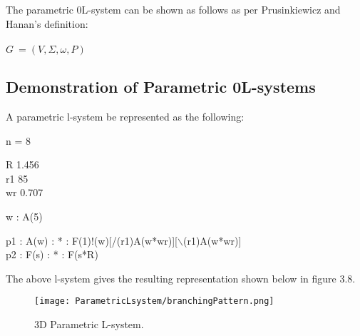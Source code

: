 \begin{flushleft}
The parametric 0L-system can be shown as follows as per Prusinkiewicz and Hanan's definition:\\
\\
$G~ = (V, \Sigma, \omega, P)$ 

\cite{prusinkiewicz2012algorithmic} 

\subsection{Demonstration of Parametric 0L-systems}

A parametric l-system be represented as the following: \\

\vspace{5mm}

\hspace*{3cm} n = 8\\

\vspace{5mm}

\hspace*{3cm} R 1.456\\
\hspace*{3cm} r1 85\\
\hspace*{3cm} wr 0.707\\

\vspace{5mm}

\hspace*{3cm} w : A(5)\\

\vspace{5mm}

\hspace*{3cm} p1 : A(w) : * : F(1)!(w)[/(r1)A(w*wr)][$\backslash$(r1)A(w*wr)]\\
\hspace*{3cm} p2 : F(s) : * : F(s*R)\\

\vspace{5mm}

The above l-system gives the resulting representation shown below in figure 3.8. 

\begin{figure}[htbp]
	{\centering
		\vspace{7px}
		\texttt{[image: ParametricLsystem/branchingPattern.png]}
		\caption{3D Parametric L-system.}
	}
\end{figure}


\end{flushleft}
